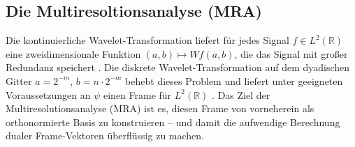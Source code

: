 \documentclass[a4paper,11pt,bibliography=totoc,listof=totoc,headinclude=true,cleardoublepage=empty,oneside]{scrbook}
\theoremstyle{definition}
\theoremstyle{remark}
\begin{document}
%
%
%

  \subsection{Die Multiresoltionsanalyse (MRA)}

%
%

   Die kontinuierliche Wavelet-Transformation liefert für jedes Signal
   $f \in L^2(\mathbb{R})$ eine zweidimensionale Funktion
   $(a,b) \mapsto Wf(a,b)$, die das Signal mit gro\ss er Redundanz
   speichert \cite[S.\,91]{blatterWaveletsEinfuhrung2003}.
   Die diskrete Wavelet-Transformation auf dem dyadischen Gitter
   $a = 2^{-m}$, $b = n \cdot 2^{-m}$ behebt dieses Problem und liefert
   unter geeigneten Voraussetzungen an $\psi$ einen Frame für
   $L^2(\mathbb{R})$ \cite[S.\,106, Abschn.\,5.1]{blatterWaveletsEinfuhrung2003}.
   Das Ziel der Multiresolutionsanalyse (MRA) ist es, diesen Frame
   von vorneherein als orthonormierte Basis zu konstruieren -- und damit
   die aufwendige Berechnung dualer Frame-Vektoren überflüssig zu machen.
\end{document}
